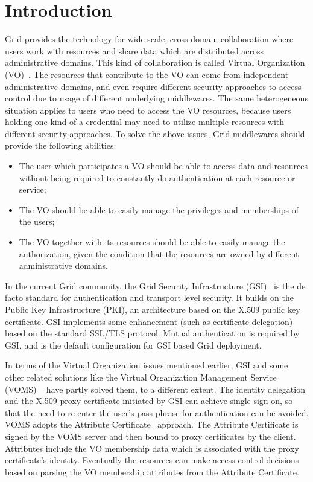 \documentclass[conference]{IEEEtran}
\begin{document}
\section{Introduction}
\label{sec:intro}
Grid provides the technology for wide-scale, cross-domain collaboration where users work with resources and share data which are distributed across administrative domains. This kind of collaboration is called Virtual Organization (VO)~\cite{IFoster01}. The resources that contribute to the VO can come from independent administrative domains, and even require different security approaches to access control due to usage of different underlying middlewares. The same heterogeneous situation applies to users who need to access the VO resources, because users holding one kind of a credential may need to utilize multiple resources with different security approaches. To solve the above issues, Grid middlewares should provide the following abilities:
\begin{itemize}
\item The user which participates a VO should be able to access data and resources without being required to constantly do authentication at each resource or service;
\item The VO should be able to easily manage the privileges and memberships of the users;
\item The VO together with its resources should be able to easily manage the authorization, given the condition that the resources are owned by different administrative domains.
\end{itemize}
In the current Grid community, the Grid Security Infrastructure (GSI)~\cite{IFoster98} is the de facto standard for authentication and transport level security. It builds on the Public Key Infrastructure (PKI), an architecture based on the X.509 public key certificate. GSI implements some enhancement (such as certificate delegation) based on the standard SSL/TLS protocol. Mutual authentication is required by GSI, and is the default configuration for GSI based Grid deployment.

In terms of the Virtual Organization issues mentioned earlier, GSI and some other related solutions like the Virtual Organization Management Service (VOMS) ~\cite{AlfieriR05} have partly solved them, to a different extent. The identity delegation and the X.509 proxy certificate initiated by GSI can achieve single sign-on, so that the need to re-enter the user’s pass phrase for authentication can be avoided. VOMS adopts the Attribute Certificate~\cite{RFC3821link} approach. The Attribute Certificate is signed by the VOMS server and then bound to proxy certificates by the client. Attributes include the VO membership data which is associated with the proxy certificate’s identity. Eventually the resources can make access control decisions based on parsing the VO membership attributes from the Attribute Certificate.
\end{document}
